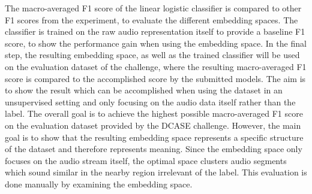 \newline
\newline
The macro-averaged F1 score of the linear logistic classifier is compared to other F1 scores from the experiment, to evaluate the different embedding spaces. The classifier is trained on the raw audio representation itself to provide a baseline F1 score, to show the performance gain when using the embedding space.
\newline
\newline
In the final step, the resulting embedding space, as well as the trained classifier will be used on the evaluation dataset of the challenge, where the resulting macro-averaged F1 score is compared to the accomplished score by the submitted models. The aim is to show the result which can be accomplished when using the dataset in an unsupervised setting and only focusing on the audio data itself rather than the label.
\newline
\newline
The overall goal is to achieve the highest possible macro-averaged F1 score on the evaluation dataset provided by the DCASE challenge. 
\newline
\newline
However, the main goal is to show that the resulting embedding space represents a specific structure of the dataset and therefore represents meaning. Since the embedding space only focuses on the audio stream itself, the optimal space clusters audio segments which sound similar in the nearby region irrelevant of the label. This evaluation is done manually by examining the embedding space.
